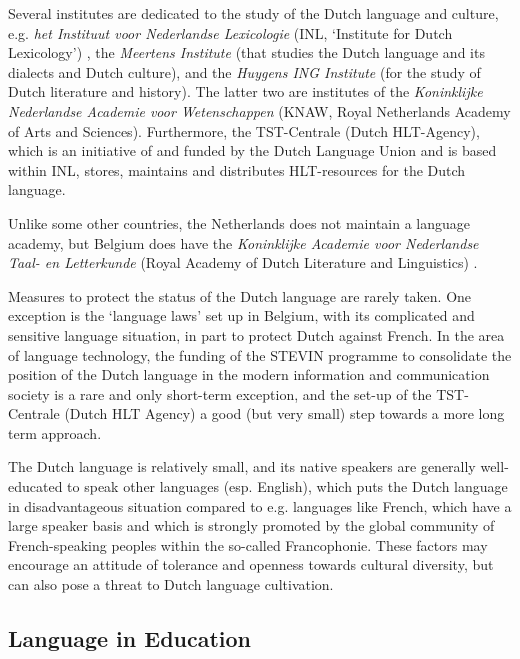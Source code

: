\documentclass[]{../../metanetpaper}
\begin{document}
\begin{multicols}{2}
    Several institutes are dedicated to the study of the Dutch language and culture, e.g. \emph{het Instituut voor Nederlandse Lexicologie} (INL, `Institute for Dutch Lexicology') \cite{INL}, the \emph{Meertens Institute} \cite{MI} (that studies the Dutch language and its dialects and Dutch culture), and the \emph{Huygens ING Institute} \cite{HING} (for the study of Dutch literature and history). The latter two are institutes of the \emph{Koninklijke Nederlandse Academie voor Wetenschappen} \cite{KNAW} (KNAW, Royal Netherlands Academy of Arts and Sciences).  Furthermore, the TST-Centrale \cite{TST-Centrale} (Dutch HLT-Agency), which is an initiative of and funded by the Dutch Language Union and is based within  INL, stores, maintains and distributes HLT-resources for the Dutch language.


    Unlike some other countries, the Netherlands does not maintain a language academy, but Belgium does have the \emph{Koninklijke Academie voor Nederlandse Taal- en Letterkunde} (Royal Academy of Dutch Literature and Linguistics) \cite{Kantl}.

    Measures to protect the status of the Dutch language are rarely taken. One exception is the `language laws' set up in Belgium, with its complicated and sensitive language situation, in part to protect Dutch against French. In the area of language technology, the funding of the STEVIN programme to consolidate the position of the Dutch language in the modern information and communication society is a rare and only short-term exception, and the set-up of the TST-Centrale (Dutch HLT Agency) a good (but very small) step towards a more long term approach.

    The Dutch language is relatively small, and its native speakers are generally well-educated to speak other languages (esp. English), which puts the Dutch language in disadvantageous situation compared to e.g. languages like French, which have a large speaker basis and which is strongly promoted by the global community of French-speaking peoples within the so-called Francophonie. These factors may encourage an attitude of tolerance and openness towards cultural diversity, but can also pose a threat to Dutch language cultivation.

\subsection{Language in Education}


\end{multicols}
\end{document}
